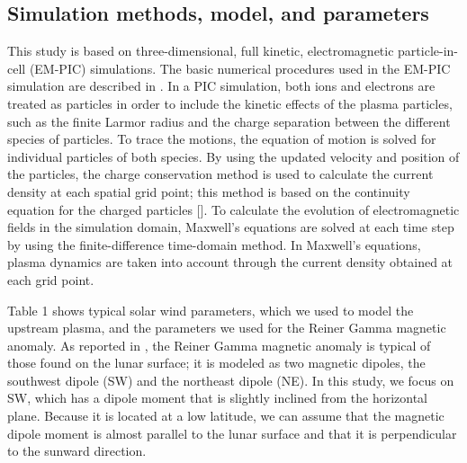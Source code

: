 \documentclass[draft,jgrga]{agutex2015}
\begin{document}
\begin{article}
\section{Simulation methods, model, and parameters}
This study is based on three-dimensional, full kinetic,
electromagnetic particle-in-cell (EM-PIC) simulations.
The basic numerical procedures used in the EM-PIC simulation are 
described in \cite{Birdsall1991}.  
In a PIC simulation, 
both ions and electrons are treated as particles in order to include
the kinetic effects of the plasma particles, 
such as the finite Larmor radius and the charge separation 
between the different species of particles. 
To trace the motions, 
the equation of motion is solved for individual particles of both species.
By using the updated velocity and position of the particles, the charge conservation method
is used to calculate the current density at each spatial grid point; this method is based on the continuity equation 
for the charged particles [\cite{Villasenor1992}].
To calculate the evolution of electromagnetic fields in the simulation domain,
Maxwell's equations are solved at each time step
by using the finite-difference time-domain method.
In Maxwell's equations, plasma dynamics are taken into account through
the current density obtained at each grid point.

Table 1 shows typical solar wind parameters,
which we used to model the upstream plasma, and the parameters we used for the Reiner Gamma magnetic anomaly.
As reported in \cite{kurata2005}, 
the Reiner Gamma magnetic anomaly is typical of those found on the lunar surface; it
is modeled as two magnetic dipoles, the southwest dipole (SW) and the northeast dipole (NE).
In this study, 
we focus on SW, which has a dipole moment that is slightly
inclined from the horizontal plane.
Because it is located at a low latitude,
we can assume that the magnetic dipole moment is almost parallel to the lunar surface
and that it is perpendicular to the sunward direction. 



\end{article}
\end{document}
